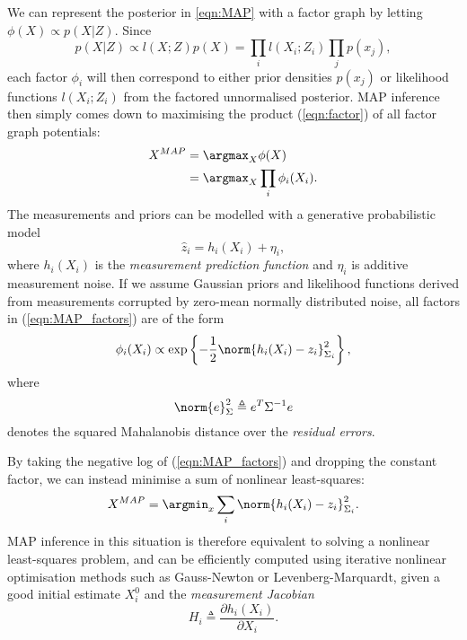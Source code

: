 We can represent the posterior in \eqref{eqn:MAP} with a factor graph by letting $\phi(X) \propto p(X|Z)$. 
Since
\begin{equation}
    p(X|Z) \propto l(X;Z)p(X) = \prod_i l(X_i;Z_i) \prod_j p(x_j),
\end{equation}
each factor $\phi_i$ will then correspond to either prior densities $p(x_j)$ or likelihood functions $l(X_i;Z_i)$ from the factored unnormalised posterior. MAP inference then simply comes down to maximising the product (\ref{eqn:factor}) of all factor graph potentials:
\begin{align}
    X^{MAP} &= \argmax_X \phi(X)\\
            &= \argmax_X \prod_i \phi_i(X_i). \label{eqn:MAP_factors}
\end{align}
The measurements and priors can be modelled with a generative probabilistic model
\begin{equation}
    \hat{z}_i = h_i(X_i) + \eta_i,
\end{equation}
where $h_i(X_i)$ is the \textit{measurement prediction function} and $\eta_i$ is additive measurement noise.
If we assume Gaussian priors and likelihood functions derived from measurements corrupted by zero-mean normally distributed noise, all factors in (\ref{eqn:MAP_factors}) are of the form
\begin{equation}
    \phi_i(X_i) \propto \exp \left \{ - \frac{1}{2} \norm{h_i(X_i) - z_i}_{\Sigma_i}^2 \right \},
\end{equation}
where
\begin{equation}
    \norm{e}_{\Sigma}^{2} \triangleq e^T \Sigma^{-1} e
\end{equation}
denotes the squared Mahalanobis distance over the \textit{residual errors}.

By taking the negative log of (\ref{eqn:MAP_factors}) and dropping the constant factor, we can instead minimise a sum of nonlinear least-squares:
\begin{equation}
    X^{MAP} = \argmin_x \sum_i \norm{h_i(X_i) - z_i}_{\Sigma_i}^2. \label{eqn:nonlinear_ls}
\end{equation}
MAP inference in this situation is therefore equivalent to solving a nonlinear least-squares problem,
and can be efficiently computed using iterative nonlinear optimisation methods such as Gauss-Newton or Levenberg-Marquardt, given a good initial estimate $X^0_i$ and the \textit{measurement Jacobian}
\begin{equation}
    H_i \triangleq \frac{\partial h_i(X_i)}{\partial X_i}.
\end{equation}

